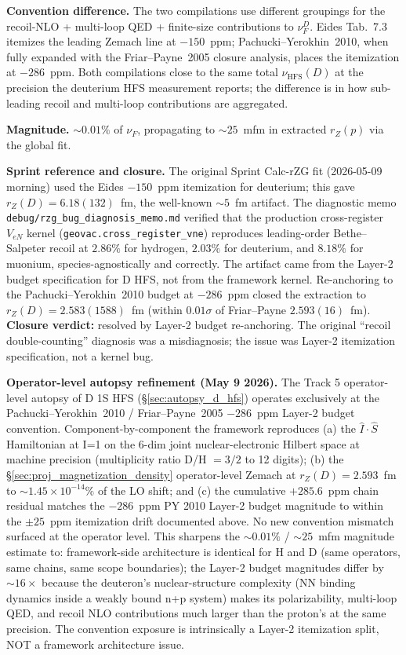 \documentclass[11pt]{article}
\begin{document}
\textbf{Convention difference.}  The two compilations use different
groupings for the recoil-NLO + multi-loop QED + finite-size
contributions to $\nu_F^D$.  Eides Tab.~7.3 itemizes the leading
Zemach line at $-150$~ppm; Pachucki--Yerokhin~2010, when fully
expanded with the Friar--Payne~2005 closure analysis, places the
itemization at $-286$~ppm.  Both compilations close to the same
total $\nu_\text{HFS}(D)$ at the precision the deuterium HFS
measurement reports; the difference is in how sub-leading recoil and
multi-loop contributions are aggregated.

\textbf{Magnitude.}  $\sim 0.01\%$ of $\nu_F$, propagating to
$\sim 25$~mfm in extracted $r_Z(p)$ via the global fit.

\textbf{Sprint reference and closure.}  The original Sprint Calc-rZG
fit (2026-05-09 morning) used the Eides $-150$~ppm itemization for
deuterium; this gave $r_Z(D) = 6.18(132)$~fm, the well-known
$\sim 5$~fm artifact.  The diagnostic memo
\texttt{debug/rzg\_bug\_diagnosis\_memo.md} verified that the
production cross-register $V_{eN}$ kernel
(\texttt{geovac.cross\_register\_vne}) reproduces leading-order
Bethe--Salpeter recoil at $2.86\%$ for hydrogen, $2.03\%$ for
deuterium, and $8.18\%$ for muonium, species-agnostically and
correctly.  The artifact came from the Layer-2 budget specification
for D HFS, not from the framework kernel.  Re-anchoring to the
Pachucki--Yerokhin~2010 budget at $-286$~ppm closed the extraction
to $r_Z(D) = 2.583(1588)$~fm (within $0.01\sigma$ of Friar--Payne
$2.593(16)$~fm).  \textbf{Closure verdict:} resolved by Layer-2
budget re-anchoring.  The original ``recoil double-counting''
diagnosis was a misdiagnosis; the issue was Layer-2 itemization
specification, not a kernel bug.

\textbf{Operator-level autopsy refinement (May 9 2026).}  The Track 5
operator-level autopsy of D 1S HFS (\S\ref{sec:autopsy_d_hfs})
operates exclusively at the Pachucki--Yerokhin~2010 / Friar--Payne~2005
$-286$~ppm Layer-2 budget convention.  Component-by-component the
framework reproduces (a) the $\hat{I}\cdot\hat{S}$ Hamiltonian at I=1
on the 6-dim joint nuclear-electronic Hilbert space at machine
precision (multiplicity ratio D/H $= 3/2$ to 12 digits); (b) the
\S\ref{sec:proj_magnetization_density} operator-level Zemach at
$r_Z(D) = 2.593$~fm to $\sim 1.45 \times 10^{-14}\%$ of the LO shift;
and (c) the cumulative $+285.6$~ppm chain residual matches the
$-286$~ppm PY 2010 Layer-2 budget magnitude to within the $\pm 25$~ppm
itemization drift documented above.  No new convention mismatch
surfaced at the operator level.  This sharpens the $\sim 0.01\%$ /
$\sim 25$~mfm magnitude estimate to: framework-side architecture is
identical for H and D (same operators, same chains, same scope
boundaries); the Layer-2 budget magnitudes differ by $\sim 16\times$
because the deuteron's nuclear-structure complexity (NN binding
dynamics inside a weakly bound n+p system) makes its polarizability,
multi-loop QED, and recoil NLO contributions much larger than the
proton's at the same precision.  The convention exposure is
intrinsically a Layer-2 itemization split, NOT a framework
architecture issue.
\end{document}
